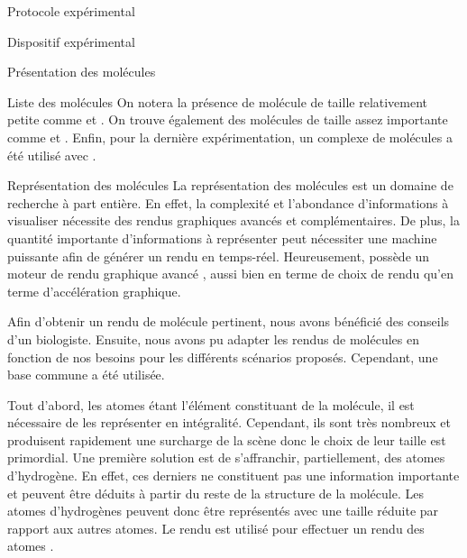 \documentclass[myfrancais]{mythesis}
\begin{document}
\begin{mychapter}{Protocole expérimental}
\begin{mysection}{Dispositif expérimental}
\begin{mysubsection}{Présentation des molécules}
\begin{mysubsubsection}{Liste des molécules}
					On notera la présence de molécule de taille relativement petite comme \myTRPZIPPER et \myTRPCAGE.
					On trouve également des molécules de taille assez importante comme \myPrion et \myUbiquitin.
					Enfin, pour la dernière expérimentation, un complexe de molécules a été utilisé avec \myNusENusG.
				\end{mysubsubsection}
				\begin{mysubsubsection}{Représentation des molécules}
					La représentation des molécules est un domaine de recherche à part entière.
					En effet, la complexité et l'abondance d'informations à visualiser nécessite des rendus graphiques avancés et complémentaires.
					De plus, la quantité importante d'informations à représenter peut nécessiter une machine puissante afin de générer un rendu en temps-réel.
					Heureusement,  possède un moteur de rendu graphique avancé , aussi bien en terme de choix de rendu qu'en terme d'accélération graphique.

					Afin d'obtenir un rendu de molécule pertinent, nous avons bénéficié des conseils d'un biologiste.
					Ensuite, nous avons pu adapter les rendus de molécules en fonction de nos besoins pour les différents scénarios proposés.
					Cependant, une base commune a été utilisée.

					Tout d'abord, les atomes étant l'élément constituant de la molécule, il est nécessaire de les représenter en intégralité.
					Cependant, ils sont très nombreux et produisent rapidement une surcharge de la scène donc le choix de leur taille est primordial.
					Une première solution est de s'affranchir, partiellement, des atomes d'hydrogène.
					En effet, ces derniers ne constituent pas une information importante et peuvent être déduits à partir du reste de la structure de la molécule.
					Les atomes d'hydrogènes peuvent donc être représentés avec une taille réduite par rapport aux autres atomes.
					Le rendu \myCPK est utilisé pour effectuer un rendu des atomes .

					\begin{myfigure}
					\end{myfigure}


\end{mysubsubsection}
\end{mysubsection}
\end{mysection}
\end{mychapter}
\end{document}
